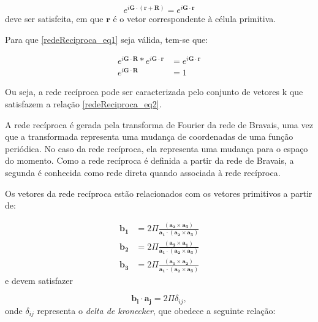       \begin{equation}\label{redeReciproca_eq1}
        e^{i\mathbf{G}\cdot (\mathbf{r}+\mathbf{R})} = e^{i\mathbf{G}\cdot\mathbf{r}}
      \end{equation}
      deve ser satisfeita, em que $\mathbf{r}$ é o vetor correspondente à célula primitiva.

      Para que \eqref{redeReciproca_eq1} seja válida, tem-se que:

      \begin{align}\label{redeReciproca_eq2}
        e^{i\mathbf{G}\cdot\mathbf{R}}\ast e^{i\mathbf{G}\cdot\mathbf{r}} &= e^{i\mathbf{G}\cdot\mathbf{r}}\\
        e^{i\mathbf{G}\cdot\mathbf{R}}                                    &= 1
      \end{align}

      Ou seja, a rede recíproca pode ser caracterizada pelo conjunto de vetores k que satisfazem a relação \eqref{redeReciproca_eq2}. 
      
      A rede recíproca é gerada pela transforma de Fourier da rede de Bravais, uma vez que a transformada representa uma mudança de coordenadas de uma função periódica.\cite{qm_fis7} No caso da rede recíproca, ela representa uma mudança para o espaço do momento.\cite{qm_fis8} Como a rede recíproca é definida a partir da rede de Bravais, a segunda é conhecida como rede direta quando associada à rede recíproca.\cite{qm_fis5}
      
      Os vetores da rede recíproca estão relacionados com os vetores primitivos a partir de:
      
      \begin{align}\label{redeReciproca_eq3}
        \mathbf{b_{1}} &= 2 \Pi \frac{(\mathbf{a_{2}} \times \mathbf{a_{3}})} {\mathbf{a_{1}} \cdot (\mathbf{a_{2}} \times \mathbf{a_{3}})}\\
        \mathbf{b_{2}} &= 2 \Pi \frac{(\mathbf{a_{3}} \times \mathbf{a_{1}})} {\mathbf{a_{1}} \cdot (\mathbf{a_{2}} \times \mathbf{a_{3}})}\\
        \mathbf{b_{3}} &= 2 \Pi \frac{(\mathbf{a_{1}} \times \mathbf{a_{2}})} {\mathbf{a_{1}} \cdot (\mathbf{a_{2}} \times \mathbf{a_{3}})}
      \end{align}
      e devem satisfazer

      \begin{equation}\label{redeReciproca_eq4}
        \mathbf{b_{i}}\cdot \mathbf{a_{j}} = 2\Pi \delta_{ij},
      \end{equation}
      onde $\delta_{ij}$ representa o \textit{delta de kronecker}, que obedece a seguinte relação:

